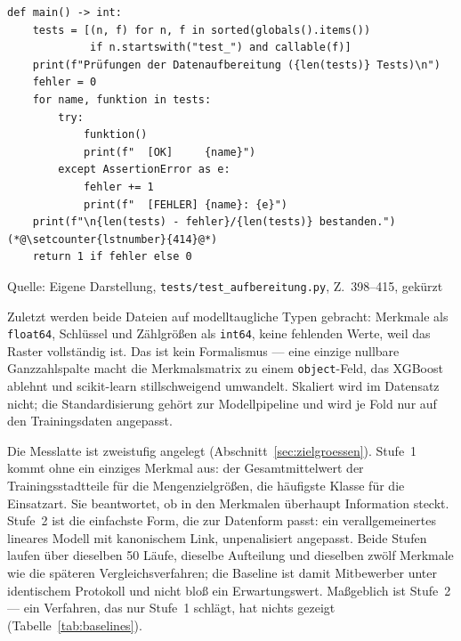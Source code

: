 \documentclass[12pt,a4paper]{article}
\newcommand{\tabquelle}[1][Eigene Darstellung]{%
  \par\setlength{\parskip}{0pt}\vspace{3pt}%
  {\setstretch{1}\fontsize{9pt}{11pt}\selectfont\raggedright Quelle: #1\par}%
}
\begin{document}
\begin{quellcode}[htbp]
\caption{Sammeln und Ausführen aller Prüfungen}
\label{lst:testlauf}\vspace{-3.5pt}
\begin{lstlisting}[style=pythonstil,firstnumber=398]
def main() -> int:
    tests = [(n, f) for n, f in sorted(globals().items())
             if n.startswith("test_") and callable(f)]
    print(f"Prüfungen der Datenaufbereitung ({len(tests)} Tests)\n")
    fehler = 0
    for name, funktion in tests:
        try:
            funktion()
            print(f"  [OK]     {name}")
        except AssertionError as e:
            fehler += 1
            print(f"  [FEHLER] {name}: {e}")
    print(f"\n{len(tests) - fehler}/{len(tests)} bestanden.")(*@\setcounter{lstnumber}{414}@*)
    return 1 if fehler else 0
\end{lstlisting}
\tabquelle[Eigene Darstellung, \texttt{tests/test\_aufbereitung.py}, Z.~398--415, gekürzt]
\end{quellcode}
 
Zuletzt werden beide Dateien auf modelltaugliche Typen gebracht: Merkmale als
\texttt{float64}, Schlüssel und Zählgrößen als \texttt{int64}, keine fehlenden
Werte, weil das Raster vollständig ist. Das ist
kein Formalismus --- eine einzige nullbare Ganzzahlspalte macht die
Merkmalsmatrix zu einem \texttt{object}-Feld, das XGBoost ablehnt und
scikit-learn stillschweigend umwandelt. Skaliert wird im Datensatz nicht; die
Standardisierung gehört zur Modellpipeline und wird je Fold nur auf den
Trainingsdaten angepasst.
 
Die Messlatte ist zweistufig angelegt (Abschnitt~\ref{sec:zielgroessen}).
Stufe~1 kommt ohne ein einziges Merkmal aus: der Gesamtmittelwert der
Trainingsstadtteile für die Mengenzielgrößen, die häufigste Klasse für die
Einsatzart. Sie beantwortet, ob in den Merkmalen überhaupt Information steckt.
Stufe~2 ist die einfachste Form, die zur Datenform passt: ein verallgemeinertes
lineares Modell mit kanonischem Link, unpenalisiert angepasst. Beide Stufen
laufen über dieselben 50 Läufe, dieselbe Aufteilung und dieselben zwölf
Merkmale wie die späteren Vergleichsverfahren; die Baseline ist damit
Mitbewerber unter identischem Protokoll und nicht bloß ein Erwartungswert.
Maßgeblich ist Stufe~2 --- ein Verfahren, das nur Stufe~1 schlägt, hat nichts
gezeigt (Tabelle~\ref{tab:baselines}).
 
\end{document}
